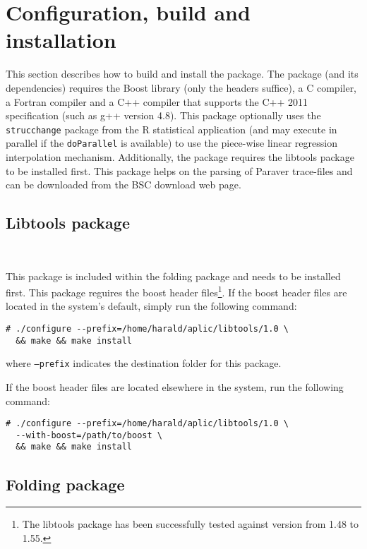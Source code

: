 \section{Configuration, build and installation}

This section describes how to build and install the \FOLDING package.
The \FOLDING package (and its dependencies) requires the Boost library (only the headers suffice), a C compiler, a Fortran compiler and a C++ compiler that supports the C++ 2011 specification (such as g++ version 4.8).
This package optionally uses the \texttt{strucchange} package from the R statistical application (and may execute in parallel if the \texttt{doParallel} is available) to use the piece-wise linear regression interpolation mechanism.
Additionally, the \FOLDING package requires the libtools package to be installed first.
This package helps on the parsing of Paraver trace-files and can be downloaded from the BSC download web page.

\subsection{Libtools package}~\label{subsec:LibtoolsInstallation}

This package is included within the folding package and needs to be installed first.
This package reguires the boost header files\footnote{The libtools package has been successfully tested against version from 1.48 to 1.55.}.
If the boost header files are located in the system's default, simply run the following command:

\begin{verbatim}
# ./configure --prefix=/home/harald/aplic/libtools/1.0 \
  && make && make install
\end{verbatim}

where \texttt{--prefix} indicates the destination folder for this package.

If the boost header files are located elsewhere in the system, run the following command:

\begin{verbatim}
# ./configure --prefix=/home/harald/aplic/libtools/1.0 \
  --with-boost=/path/to/boost \
  && make && make install
\end{verbatim}

\subsection{Folding package}

